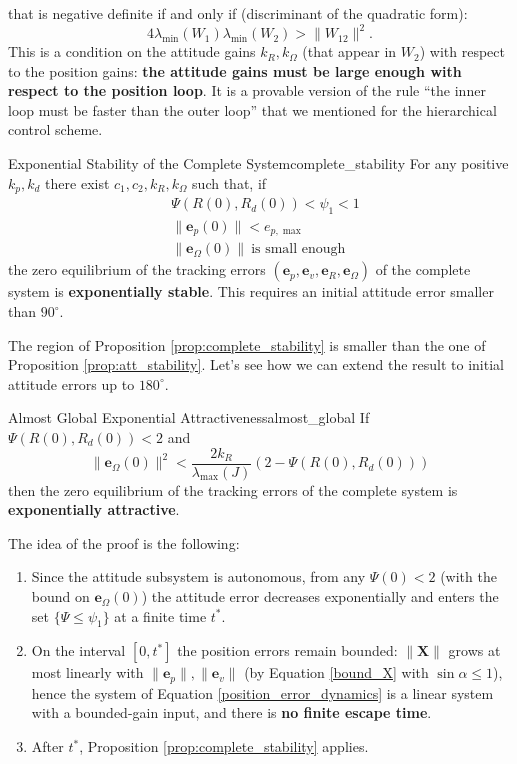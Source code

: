 \documentclass[10pt, a4paper]{report}
\begin{document}
that is negative definite if and only if (discriminant of the quadratic form):\begin{equation}
    4\lambda_{\min}(W_1)\lambda_{\min}(W_2)>\|W_{12}\|^2.
\end{equation}
This is a condition on the attitude gains $k_R,k_\Omega$ (that appear in $W_2$) with respect to the position gains: \textbf{the attitude gains must be large enough with respect to the position loop}. It is a provable version of the rule ``the inner loop must be faster than the outer loop'' that we mentioned for the hierarchical control scheme.
\begin{boxproposition}{Exponential Stability of the Complete System}{complete_stability}
For any positive $k_p,k_d$ there exist $c_1,c_2,k_R,k_\Omega$ such that, if \begin{align}
    &\Psi(R(0),R_d(0))<\psi_1<1\\
    &\|\mathbf e_p(0)\|<e_{p,\max}\\
    &\|\mathbf e_\Omega(0)\|\ \text{is small enough}
\end{align}
the zero equilibrium of the tracking errors $(\mathbf e_p,\mathbf e_v,\mathbf e_R,\mathbf e_\Omega)$ of the complete system is \textbf{exponentially stable}. This requires an initial attitude error smaller than $90^\circ$.
\end{boxproposition}
\noindent The region of Proposition \ref{prop:complete_stability} is smaller than the one of Proposition \ref{prop:att_stability}. Let's see how we can extend the result to initial attitude errors up to $180^\circ$.
\begin{boxproposition}{Almost Global Exponential Attractiveness}{almost_global}
If $\Psi(R(0),R_d(0))<2$ and \begin{equation}
    \|\mathbf e_\Omega(0)\|^2<\frac{2k_R}{\lambda_{\max}(J)}\left(2-\Psi(R(0),R_d(0))\right)
\end{equation}
then the zero equilibrium of the tracking errors of the complete system is \textbf{exponentially attractive}.
\end{boxproposition}
\noindent The idea of the proof is the following:\begin{enumerate}
    \item Since the attitude subsystem is autonomous, from any $\Psi(0)<2$ (with the bound on $\mathbf e_\Omega(0)$) the attitude error decreases exponentially and enters the set $\{\Psi\le\psi_1\}$ at a finite time $t^*$.
    \item On the interval $[0,t^*]$ the position errors remain bounded: $\|\mathbf X\|$ grows at most linearly with $\|\mathbf e_p\|,\|\mathbf e_v\|$ (by Equation \eqref{bound_X} with $\sin\alpha\le1$), hence the system of Equation \eqref{position_error_dynamics} is a linear system with a bounded-gain input, and there is \textbf{no finite escape time}.
    \item After $t^*$, Proposition \ref{prop:complete_stability} applies.
\end{enumerate}
\end{document}

